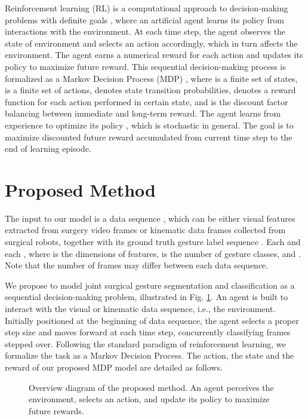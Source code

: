 \documentclass{llncs}
\begin{document}
Reinforcement learning (RL) is a computational approach to decision-making problems with definite goals \cite{sutton1998reinforcement}, where an artificial agent learns its policy from interactions with the environment. At each time step, the agent observes the state of environment and selects an action accordingly, which in turn affects the environment. The agent earns a numerical reward for each action and updates its policy to maximize future reward. This sequential decision-making process is formalized as a Markov Decision Process (MDP) \cite{sutton1998reinforcement} , where  is a finite set of states,  is a finite set of actions,  denotes state transition probabilities,  denotes a reward function for each action performed in certain state, and  is the discount factor balancing between immediate and long-term reward. The agent learns from experience to optimize its policy , which is stochastic in general. The goal is to maximize discounted future reward accumulated from current time step to the end of learning episode.

\section{Proposed Method}

The input to our model is a data sequence , which can be either visual features extracted from surgery video frames or kinematic data frames collected from surgical robots, together with its ground truth gesture label sequence . Each  and each , where  is the dimensions of features,  is the number of gesture classes, and . Note that the number of frames  may differ between each data sequence.

We propose to model joint surgical gesture segmentation and classification as a sequential decision-making problem, illustrated in Fig. \ref{fig:f1}. An agent is built to interact with the visual or kinematic data sequence, i.e., the environment. Initially positioned at the beginning of data sequence, the agent selects a proper step size and moves forward at each time step, concurrently classifying frames stepped over. Following the standard paradigm of reinforcement learning, we formalize the task as a Markov Decision Process. The action, the state and the reward of our proposed MDP model are detailed as follows. 

\begin{figure}[t]
\centering
{}
\caption{Overview diagram of the proposed method. An agent perceives the environment, selects an action, and update its policy to maximize future rewards.}
\label{fig:f1}
\end{figure}
\end{document}
